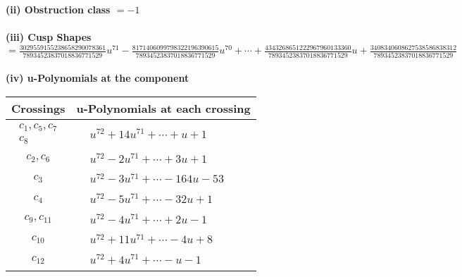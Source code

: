 \documentclass[1p]{elsarticle_modified}
\theoremstyle{definition}
\begin{document}
\flushleft \textbf{(ii) Obstruction class $= -1$}\\~\\
\flushleft \textbf{(iii) Cusp Shapes $= \frac{3029559155238658290078361}{78934523837018836771529} u^{71}-\frac{8171406099798322196390615}{78934523837018836771529} u^{70}+\cdots+\frac{4343268651222967960133360}{78934523837018836771529} u+\frac{3408340608627538586838312}{78934523837018836771529}$}\\~\\
\newpage\renewcommand{\arraystretch}{1}
\flushleft \textbf{(iv) u-Polynomials at the component}\newline \\
\begin{tabular}{m{50pt}|m{274pt}}
Crossings & \hspace{64pt}u-Polynomials at each crossing \\
\hline $$\begin{aligned}c_{1},c_{5},c_{7}\\c_{8}\end{aligned}$$&$\begin{aligned}
&u^{72}+14 u^{71}+\cdots+u+1
\end{aligned}$\\
\hline $$\begin{aligned}c_{2},c_{6}\end{aligned}$$&$\begin{aligned}
&u^{72}-2 u^{71}+\cdots+3 u+1
\end{aligned}$\\
\hline $$\begin{aligned}c_{3}\end{aligned}$$&$\begin{aligned}
&u^{72}-3 u^{71}+\cdots-164 u-53
\end{aligned}$\\
\hline $$\begin{aligned}c_{4}\end{aligned}$$&$\begin{aligned}
&u^{72}-5 u^{71}+\cdots-32 u+1
\end{aligned}$\\
\hline $$\begin{aligned}c_{9},c_{11}\end{aligned}$$&$\begin{aligned}
&u^{72}-4 u^{71}+\cdots+2 u-1
\end{aligned}$\\
\hline $$\begin{aligned}c_{10}\end{aligned}$$&$\begin{aligned}
&u^{72}+11 u^{71}+\cdots-4 u+8
\end{aligned}$\\
\hline $$\begin{aligned}c_{12}\end{aligned}$$&$\begin{aligned}
&u^{72}+4 u^{71}+\cdots- u-1
\end{aligned}$\\
\hline
\end{tabular}\\~\\
\end{document}

